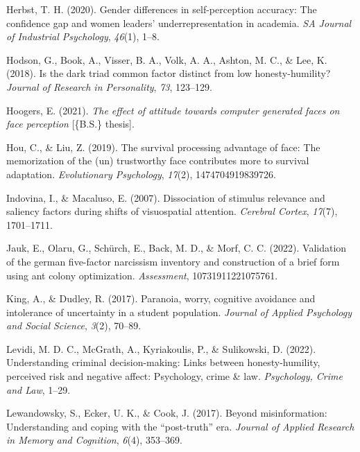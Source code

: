 \documentclass[
  man,floatsintext]{apa6}
\newlength{\cslhangindent}
\newlength{\cslentryspacingunit} %
\newenvironment{CSLReferences}[2] %
 {%
  \setlength{\parindent}{0pt}
  \ifodd #1
  \let\oldpar\par
  \def\par{\hangindent=\cslhangindent\oldpar}
  \fi
  \setlength{\parskip}{#2\cslentryspacingunit}
 }%
 {}
\begin{document}
\begin{CSLReferences}{1}{0}
\leavevmode{}%
Herbst, T. H. (2020). Gender differences in self-perception accuracy: The confidence gap and women leaders' underrepresentation in academia. \emph{SA Journal of Industrial Psychology}, \emph{46}(1), 1--8.

\leavevmode{}%
Hodson, G., Book, A., Visser, B. A., Volk, A. A., Ashton, M. C., \& Lee, K. (2018). Is the dark triad common factor distinct from low honesty-humility? \emph{Journal of Research in Personality}, \emph{73}, 123--129.

\leavevmode{}%
Hoogers, E. (2021). \emph{The effect of attitude towards computer generated faces on face perception} {[}\{B.S.\} thesis{]}.

\leavevmode{}%
Hou, C., \& Liu, Z. (2019). The survival processing advantage of face: The memorization of the (un) trustworthy face contributes more to survival adaptation. \emph{Evolutionary Psychology}, \emph{17}(2), 1474704919839726.

\leavevmode{}%
Indovina, I., \& Macaluso, E. (2007). Dissociation of stimulus relevance and saliency factors during shifts of visuospatial attention. \emph{Cerebral Cortex}, \emph{17}(7), 1701--1711.

\leavevmode{}%
Jauk, E., Olaru, G., Schürch, E., Back, M. D., \& Morf, C. C. (2022). Validation of the german five-factor narcissism inventory and construction of a brief form using ant colony optimization. \emph{Assessment}, 10731911221075761.

\leavevmode{}%
King, A., \& Dudley, R. (2017). Paranoia, worry, cognitive avoidance and intolerance of uncertainty in a student population. \emph{Journal of Applied Psychology and Social Science}, \emph{3}(2), 70--89.

\leavevmode{}%
Levidi, M. D. C., McGrath, A., Kyriakoulis, P., \& Sulikowski, D. (2022). Understanding criminal decision-making: Links between honesty-humility, perceived risk and negative affect: Psychology, crime \& law. \emph{Psychology, Crime and Law}, 1--29.

\leavevmode{}%
Lewandowsky, S., Ecker, U. K., \& Cook, J. (2017). Beyond misinformation: Understanding and coping with the {``post-truth''} era. \emph{Journal of Applied Research in Memory and Cognition}, \emph{6}(4), 353--369.


\end{CSLReferences}
\end{document}
